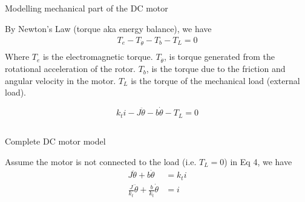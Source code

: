 \subsection{}
{
\begin{frame}{Modelling mechanical part of the DC motor}

By Newton's Law (torque aka energy balance), we have
\begin{equation} 
\begin{split}
T_e - T_{\dot \theta} - T_b - T_L = 0 \\
\end{split}
\end{equation}
Where $T_e$ is the electromagnetic torque. 
$T_{ \dot \theta }$, 
is torque generated from the rotational acceleration of the rotor. 
$T_b$, is the torque due to the friction and angular velocity in the motor. 
$T_L$ is the torque of the mechanical load (external load). 

\begin{equation}
k_t i - J \ddot  \theta - b \dot \theta  - T_L = 0
\end{equation}


\end{frame}
}


\subsection{}
{
\begin{frame}{Complete DC motor model}

Assume the motor is not connected to the load (i.e. $T_L=0$)
in Eq 4, we have
\begin{equation}
\begin{split}
J \ddot{ \theta} + b \dot \theta  &= k_t i \\
\frac{J}{k_t} \ddot{ \theta} + \frac{b}{k_t} \dot \theta &= i
\end{split}
\end{equation}


\end{frame}
}



